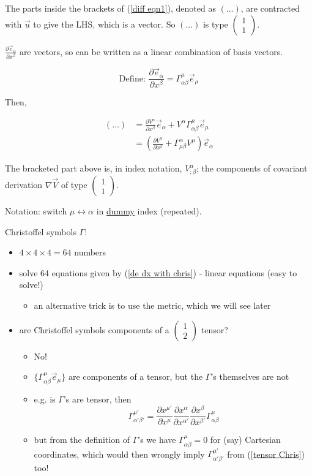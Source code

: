 \documentclass[a4paper]{article} %
\newcommand{\pmx}[1]{
\begin{pmatrix}
#1
\end{pmatrix}
}
\begin{document}
The parts inside the brackets of (\ref{diff eqn1}), denoted as $(\ldots)$, are contracted with $\vec{u}$ to give the LHS, which is a vector. So $(\ldots)$ is type $\pmx{1\\1}$.

$\frac{\partial \vec{e}_{\alpha}}{\partial x^{\beta}}$ are vectors, so can be written as a linear combination of basis vectors. 

\begin{equation}
\text{Define: } \frac{\partial \vec{e}_{\alpha}}{\partial x^{\beta}}=\Gamma^{\mu}_{\alpha\beta} \vec{e}_{\mu}\label{de dx with chris}
\end{equation}

Then,

\begin{align*}
(\ldots)&=\frac{\partial V^{\alpha}}{\partial x^{\beta}}\vec{e}_{\alpha} + V^{\alpha}\Gamma^{\mu}_{\alpha\beta}\vec{e}_{\mu}\\
&=\left(\frac{\partial V^{\alpha}}{\partial x^{\beta}}+\Gamma^{\alpha}_{\mu\beta}V^{\mu}\right)
\vec{e}_{\alpha}
\end{align*}

The bracketed part above is, in index notation, $V^{\alpha}_{; \beta}$; the components of covariant derivation $\nabla \vec{V}$ of type $\pmx{1\\1}$.

Notation: switch $\mu \leftrightarrow \alpha$ in \underline{dummy} index (repeated).

Christoffel symbols $\Gamma$:
\begin{itemize}
\item $4\times 4\times 4=64$ numbers
\item solve 64 equations given by (\ref{de dx with chris}) - linear equations (easy to solve!)
\begin{itemize}
\item an alternative trick is to use the metric, which we will see later
\end{itemize}
\item are Christoffel symbols components of a $\pmx{1\\2}$ tensor?
\begin{itemize}
\item No!
\item $\{\Gamma^{\mu}_{\alpha\beta}\vec{e}_{\mu}\}$ are components of a tensor, but the $\Gamma$'s themselves are not
\item e.g. is $\Gamma$'s are tensor, then
\begin{equation}
\Gamma^{\mu'}_{\alpha' \beta'}=\frac{\partial x^{\mu'}}{\partial x^{\mu}}\frac{\partial x^{\alpha}}{\partial x^{\alpha'}}\frac{\partial x^{\beta}}{\partial x^{\beta'}}\Gamma^{\mu}_{\alpha\beta}\label{tensor Chris}
\end{equation}
\item but from the definition of $\Gamma$'s we have $\Gamma^{\mu}_{\alpha\beta}=0$ for (say) Cartesian coordinates, which would then wrongly imply $\Gamma^{\mu'}_{\alpha'\beta'}$ from (\ref{tensor Chris}) too!
\end{itemize}
\end{itemize}
\end{document}
